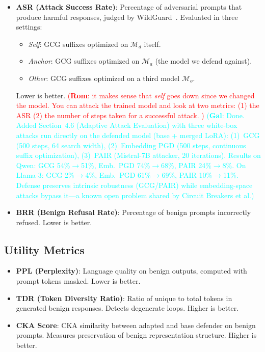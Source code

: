 \documentclass[11pt]{article}
\newcommand\rom[1]{\textcolor{red}{(\textbf{Rom}: #1)}} %
\newcommand\gal[1]{\textcolor{cyan}{(\textbf{Gal}: #1)}} %
\begin{document}
\begin{itemize}[noitemsep]
    \item \textbf{ASR (Attack Success Rate)}: Percentage of adversarial prompts that produce harmful responses, judged by WildGuard~\cite{wildguard}. Evaluated in three settings:
    \begin{itemize}[noitemsep]
        \item \emph{Self}: GCG suffixes optimized on $\mathcal{M}_d$ itself.
        \item \emph{Anchor}: GCG suffixes optimized on $\mathcal{M}_a$ (the model we defend against).
        \item \emph{Other}: GCG suffixes optimized on a third model $\mathcal{M}_o$.
    \end{itemize}
    Lower is better.
    \rom{it makes sense that \emph{self} goes down since we changed the model. You can attack the trained model and look at two metrics: (1) the ASR (2) the number of steps taken for a successful attack. } \gal{Done. Added Section~4.6 (Adaptive Attack Evaluation) with three white-box attacks run directly on the defended model (base + merged LoRA): (1)~GCG (500 steps, 64 search width), (2)~Embedding PGD (500 steps, continuous suffix optimization), (3)~PAIR (Mistral-7B attacker, 20 iterations). Results on Qwen: GCG 54\%$\to$51\%, Emb.\ PGD 74\%$\to$68\%, PAIR 24\%$\to$8\%. On Llama-3: GCG 2\%$\to$4\%, Emb.\ PGD 61\%$\to$69\%, PAIR 10\%$\to$11\%. Defense preserves intrinsic robustness (GCG/PAIR) while embedding-space attacks bypass it---a known open problem shared by Circuit Breakers et al.}

    \item \textbf{BRR (Benign Refusal Rate)}: Percentage of benign prompts incorrectly refused. Lower is better.
\end{itemize}

\subsection{Utility Metrics}

\begin{itemize}[noitemsep]
    \item \textbf{PPL (Perplexity)}: Language quality on benign outputs, computed with prompt tokens masked. Lower is better.
    \item \textbf{TDR (Token Diversity Ratio)}: Ratio of unique to total tokens in generated benign responses. Detects degenerate loops. Higher is better.
    \item \textbf{CKA Score}: CKA similarity between adapted and base defender on benign prompts. Measures preservation of benign representation structure. Higher is better.
\end{itemize}
\end{document}
